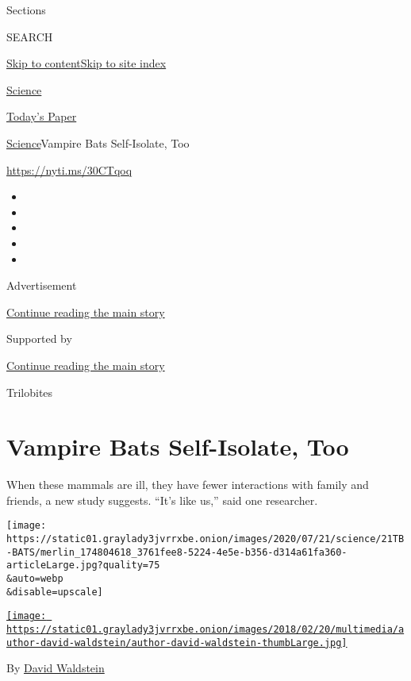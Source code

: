Sections

SEARCH

\protect\hyperlink{site-content}{Skip to
content}\protect\hyperlink{site-index}{Skip to site index}

\href{https://www.nytimes3xbfgragh.onion/section/science}{Science}

\href{https://myaccount.nytimes3xbfgragh.onion/auth/login?response_type=cookie\&client_id=vi}{}

\href{https://www.nytimes3xbfgragh.onion/section/todayspaper}{Today's
Paper}

\href{/section/science}{Science}\textbar{}Vampire Bats Self-Isolate, Too

\url{https://nyti.ms/30CTqoq}

\begin{itemize}
\item
\item
\item
\item
\item
\end{itemize}

Advertisement

\protect\hyperlink{after-top}{Continue reading the main story}

Supported by

\protect\hyperlink{after-sponsor}{Continue reading the main story}

Trilobites

\hypertarget{vampire-bats-self-isolate-too}{%
\section{Vampire Bats Self-Isolate,
Too}\label{vampire-bats-self-isolate-too}}

When these mammals are ill, they have fewer interactions with family and
friends, a new study suggests. ``It's like us,'' said one researcher.

\texttt{[image: https://static01.graylady3jvrrxbe.onion/images/2020/07/21/science/21TB-BATS/merlin\_174804618\_3761fee8-5224-4e5e-b356-d314a61fa360-articleLarge.jpg?quality=75\\\&auto=webp\\\&disable=upscale]}

\href{https://www.nytimes3xbfgragh.onion/by/david-waldstein}{\texttt{[image: https://static01.graylady3jvrrxbe.onion/images/2018/02/20/multimedia/author-david-waldstein/author-david-waldstein-thumbLarge.jpg]}}

By \href{https://www.nytimes3xbfgragh.onion/by/david-waldstein}{David
Waldstein}

